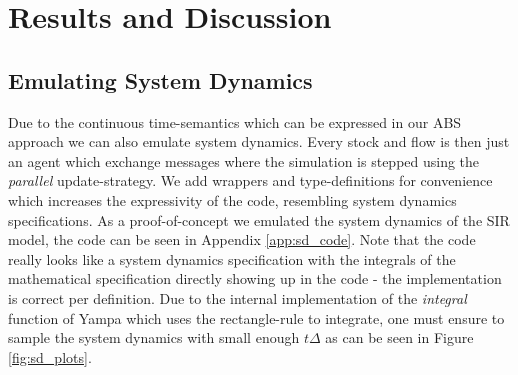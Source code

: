 \section{Results and Discussion}

\subsection{Emulating System Dynamics}
Due to the continuous time-semantics which can be expressed in our ABS approach we can also emulate system dynamics. Every stock and flow is then just an agent which exchange messages where the simulation is stepped using the \textit{parallel} update-strategy. We add wrappers and type-definitions for convenience which increases the expressivity of the code, resembling system dynamics specifications. As a proof-of-concept we emulated the system dynamics of the SIR model, the code can be seen in Appendix \ref{app:sd_code}. Note that the code really looks like a system dynamics specification with the integrals of the mathematical specification directly showing up in the code - the implementation is correct per definition. Due to the internal implementation of the \textit{integral} function of Yampa which uses the rectangle-rule to integrate, one must ensure to sample the system dynamics with small enough $t\Delta$ as can be seen in Figure \ref{fig:sd_plots}.

